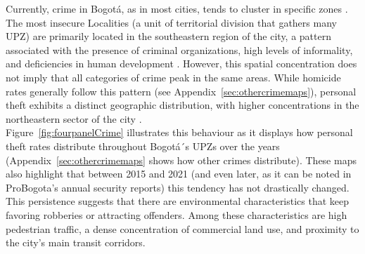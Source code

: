 \documentclass[12pt]{article}
\begin{document}
Currently, crime in Bogotá, as in most cities, tends to cluster in specific zones \parencite{Enriquez2014,GimenezSantana2018}. The most insecure Localities (a unit of territorial division that gathers many UPZ) are primarily located in the southeastern region of the city, a pattern associated with the presence of criminal organizations, high levels of informality, and deficiencies in human development \parencite{probogota2024indice}. However, this spatial concentration does not imply that all categories of crime peak in the same areas. While homicide rates generally follow this pattern (see Appendix~\ref{sec:othercrimemaps}), personal theft exhibits a distinct geographic distribution, with higher concentrations in the northeastern sector of the city \parencite{probogota2022informe}.\\ 

Figure~\ref{fig:fourpanelCrime} illustrates this behaviour as it displays how personal theft rates distribute throughout Bogotá´s UPZs over the years (Appendix~\ref{sec:othercrimemaps}  shows how other crimes distribute). These maps also highlight that between 2015 and 2021 (and even later, as it can be noted in ProBogota’s annual security reports) this tendency has not drastically changed. This persistence suggests that there are environmental characteristics that keep favoring robberies or attracting offenders. Among these characteristics are high pedestrian traffic, a dense concentration of commercial land use, and proximity to the city’s main transit corridors.\\
\end{document}

